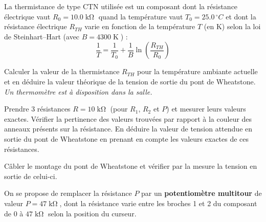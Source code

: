\documentclass[a4paper,11pt]{article}
\begin{document}
La thermistance de type CTN utilisée est un composant dont la résistance électrique vaut $R_0 = 10.0 \operatorname{k\Omega}$ quand la température vaut $T_0 = 25.0 \,^\circ C$ et dont la résistance électrique $R_{TH}$ varie en fonction de la température $T$ (en K) selon la loi de Steinhart–Hart (avec $B = 4300\operatorname{K}$) :
$$ \frac{1}{T} = \frac{1}{T_0} + \frac{1}{B} \ln \left( \frac{R_{TH}}{R_0} \right)$$

\Real Calculer la valeur de la thermistance $R_{TH}$ pour la température ambiante actuelle et en déduire la valeur théorique de la tension de sortie du pont de Wheatstone. \textit{Un thermomètre est à disposition dans la salle.}

\Real Prendre 3 résistances $R = 10 \operatorname{k\Omega}$ (pour $R_1$, $R_2$ et $P$) et mesurer leurs valeurs exactes. Vérifier la pertinence des valeurs trouvées par rapport à la couleur des anneaux présents sur la résistance. En déduire la valeur de tension attendue en sortie du pont de Wheatstone en prenant en compte les valeurs exactes de ces résistances.

\Real Câbler le montage du pont de Wheatstone et vérifier par la mesure la tension en sortie de celui-ci. 

\newpage

On se propose de remplacer la résistance $P$ par un \textbf{potentiomètre multitour} de valeur $P = 47\operatorname{k\Omega}$, dont la résistance varie entre les broches 1 et 2 du composant de $0$ à $47 \operatorname{k\Omega}$ selon la position du curseur.
\end{document}
